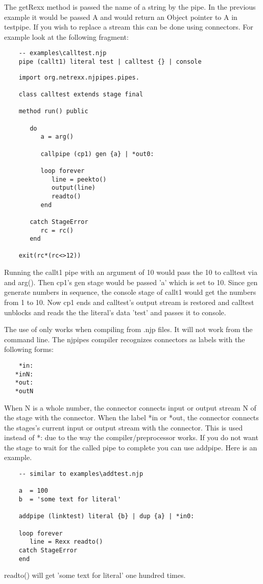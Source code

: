  The getRexx method is passed the name of a string by the pipe.  In the previous example it would be passed A and would return an Object pointer to A in testpipe. If you wish to replace a stream this can be done using connectors.  For example look at the following fragment:
\begin{verbatim}
    -- examples\calltest.njp
    pipe (callt1) literal test | calltest {} | console
\end{verbatim}
\begin{lstlisting}
    import org.netrexx.njpipes.pipes.

    class calltest extends stage final

    method run() public

       do
          a = arg()

          callpipe (cp1) gen {a} | *out0:

          loop forever
             line = peekto()
             output(line)
             readto()
          end

       catch StageError
          rc = rc()
       end

    exit(rc*(rc<>12))
\end{lstlisting}
Running the callt1 pipe with an argument of 10 would pass the 10 to calltest via {} and arg().  Then cp1's gen stage would be passed 'a' which is set to 10.  Since gen generate numbers in sequence, the console stage of callt1 would get the numbers from 1 to 10.  Now cp1 ends and calltest's output stream is restored and calltest unblocks and reads the the literal's data 'test' and passes it to console.

The use of {} only works when compiling from .njp files.  It will not work from the command line.
The njpipes compiler recognizes connectors as labels with the following forms:
\begin{verbatim}
    *in:
   *inN:
   *out:
   *outN
\end{verbatim}

When N is a whole number, the connector connects input or output stream N of the stage with the connector.
When the label *in or *out, the connector connects the stages's current input or output stream with the connector.  This is used instead of *: due to the way the compiler/preprocessor works.
If you do not want the stage to wait for the called pipe to complete you can use addpipe.  Here is an example.
\begin{lstlisting}
    -- similar to examples\addtest.njp

    a  = 100
    b  = 'some text for literal'

    addpipe (linktest) literal {b} | dup {a} | *in0:

    loop forever
       line = Rexx readto()
    catch StageError
    end
\end{lstlisting}
    readto() will get 'some text for literal' one hundred times.

